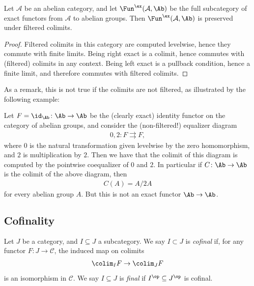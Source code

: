 \documentclass[11pt]{book}
\begin{document}
\begin{corollary}\label{cor:filtered-colimits-preserve-exactness} 
Let $\mathcal{A}$ be an abelian category, and let $\Fun^\ex(\mathcal{A},\Ab)$ be the full subcategory of exact functors from $\mathcal{A}$ to abelian groups. Then $\Fun^\ex(\mathcal{A},\Ab)$ is preserved under filtered colimits.
\end{corollary}
\begin{proof} Filtered colimits in this category are computed levelwise, hence they commute with finite limits. Being right exact is a colimit, hence commutes with (filtered) colimits in any context. Being left exact is a pullback condition, hence a finite limit, and therefore commutes with filtered colimits.
\end{proof}

As a remark, this is not true if the colimits are not filtered, as illustrated by the following example:

\begin{example} Let $F = \id_\Ab \colon \Ab \to \Ab$ be the (clearly exact) identity functor on the category of abelian groups, and consider the (non-filtered!) equalizer diagram
\begin{align*}
    0,2 \colon F \rightrightarrows F,
\end{align*}
where $0$ is the natural transformation given levelwise by the zero homomorphism, and $2$ is multiplication by $2$. Then we have that the colimit of this diagram is computed by the pointwise coequalizer of $0$ and $2$. In particular if $C \colon \Ab \to \Ab$ is the colimit of the above diagram, then
\begin{align*}
    C(A) = A/2A
\end{align*}
for every abelian group $A$. But this is not an exact functor $\Ab \to \Ab$.
\end{example}


\subsection{Cofinality}

\begin{definition}\label{def:cofinal} Let $J$ be a category, and $I \subseteq J$ a subcategory. We say $I \subset J$ is \emph{cofinal} if, for any functor $F \colon J \to \mathscr{C}$, the induced map on colimits
\begin{align*}
    \colim_I F \to \colim_J F
\end{align*}
is an isomorphism in $\mathscr{C}$. We say $I \subseteq J$ is \emph{final} if $I^\op \subseteq J^\op$ is cofinal.
\end{definition}
\end{document}
